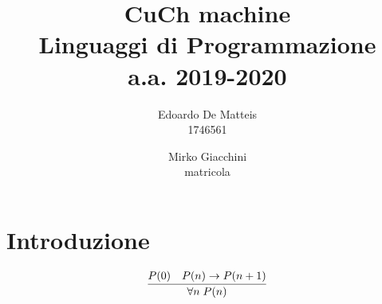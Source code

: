 \documentclass[a4paper]{article}
\title{%
	CuCh machine \\
  	\large Linguaggi di Programmazione \\ 
	a.a. 2019-2020}
\author{Edoardo De Matteis  \\ 1746561 
   \and Mirko Giacchini \\ matricola }
\date{}
\begin{document}
	\maketitle
	\tableofcontents
	
	\section{Introduzione}
		\lipsum[1]
		\[
			\infer{
				\forall n  \; P(n)
			}
			{%
 		   		P(0)
    				& P(n) \to P(n+1)
			}
		\]
\end{document}
